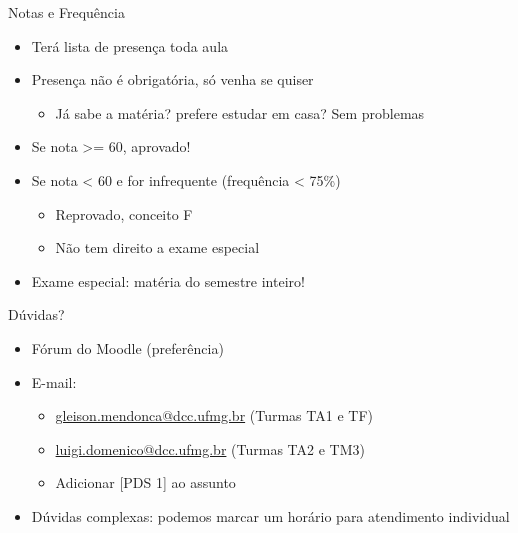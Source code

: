 \documentclass[t, aspectratio=169]{beamer}
\begin{document}
\begin{frame}[label={sec:org211ac83}]{Notas e Frequência}
\begin{itemize}
\item Terá lista de presença toda aula
\item Presença não é obrigatória, só venha se quiser
\begin{itemize}
\item Já sabe a matéria? prefere estudar em casa? Sem problemas
\end{itemize}

\item Se nota >= 60, aprovado!
\item Se nota < 60 e for infrequente (frequência < 75\%)
\begin{itemize}
\item Reprovado, conceito F
\item Não tem direito a exame especial
\end{itemize}

\item Exame especial: matéria do semestre inteiro!
\end{itemize}
\end{frame}

\begin{frame}[label={sec:orgc17f3d6}]{Dúvidas?}
\begin{itemize}
\item Fórum do Moodle (preferência)
\item E-mail:
\begin{itemize}
\item \href{mailto:gleison.mendonca@dcc.ufmg.br}{gleison.mendonca@dcc.ufmg.br} (Turmas \alert{TA1} e \alert{TF})
\item \href{mailto:luigi.domenico@dcc.ufmg.br}{luigi.domenico@dcc.ufmg.br} (Turmas \alert{TA2} e \alert{TM3})
\item Adicionar [PDS 1] ao assunto
\end{itemize}
\item Dúvidas complexas: podemos marcar um horário para atendimento individual
\end{itemize}
\end{frame}
\end{document}
